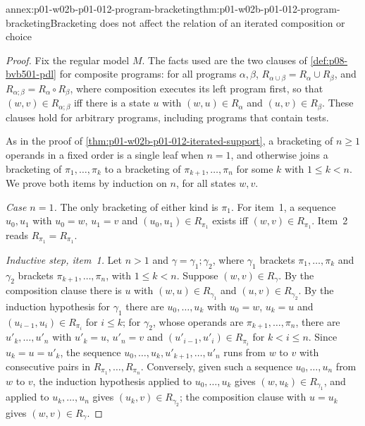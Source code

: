 \begin{annexitem}{annex:p01-w02b-p01-012-program-bracketing}{thm:p01-w02b-p01-012-program-bracketing}{Bracketing does not affect the relation of an iterated composition or choice}
\begin{proof}
Fix the regular model \(M\).  The facts used are the two clauses of
\cref{def:p08-bvb501-pdl} for composite programs: for all programs
\(\alpha,\beta\), \(R_{\alpha\cup\beta}=R_\alpha\cup R_\beta\), and
\(R_{\alpha;\beta}=R_\alpha\circ R_\beta\), where composition executes its
left program first, so that \((w,v)\in R_{\alpha;\beta}\) iff there is a
state \(u\) with \((w,u)\in R_\alpha\) and \((u,v)\in R_\beta\).  These
clauses hold for arbitrary programs, including programs that contain
tests.

As in the proof of \cref{thm:p01-w02b-p01-012-iterated-support}, a
bracketing of \(n\geq1\) operands in a fixed order is a single leaf when
\(n=1\), and otherwise joins a bracketing of \(\pi_1,\ldots,\pi_k\) to a
bracketing of \(\pi_{k+1},\ldots,\pi_n\) for some \(k\) with \(1\leq k<n\).
We prove both items by induction on \(n\), for all states \(w,v\).

\emph{Case \(n=1\).}  The only bracketing of either kind is \(\pi_1\).
For item~1, a sequence \(u_0,u_1\) with \(u_0=w\), \(u_1=v\) and
\((u_0,u_1)\in R_{\pi_1}\) exists iff \((w,v)\in R_{\pi_1}\).  Item~2 reads
\(R_{\pi_1}=R_{\pi_1}\).

\emph{Inductive step, item~1.}  Let \(n>1\) and
\(\gamma=\gamma_1;\gamma_2\), where \(\gamma_1\) brackets
\(\pi_1,\ldots,\pi_k\) and \(\gamma_2\) brackets
\(\pi_{k+1},\ldots,\pi_n\), with \(1\leq k<n\).  Suppose
\((w,v)\in R_\gamma\).  By the composition clause there is \(u\) with
\((w,u)\in R_{\gamma_1}\) and \((u,v)\in R_{\gamma_2}\).  By the induction
hypothesis for \(\gamma_1\) there are \(u_0,\ldots,u_k\) with \(u_0=w\),
\(u_k=u\) and \((u_{i-1},u_i)\in R_{\pi_i}\) for \(i\leq k\); for
\(\gamma_2\), whose operands are \(\pi_{k+1},\ldots,\pi_n\), there are
\(u'_k,\ldots,u'_n\) with \(u'_k=u\), \(u'_n=v\) and
\((u'_{i-1},u'_i)\in R_{\pi_i}\) for \(k<i\leq n\).  Since \(u_k=u=u'_k\),
the sequence \(u_0,\ldots,u_k,u'_{k+1},\ldots,u'_n\) runs from \(w\) to
\(v\) with consecutive pairs in \(R_{\pi_1},\ldots,R_{\pi_n}\).
Conversely, given such a sequence \(u_0,\ldots,u_n\) from \(w\) to \(v\),
the induction hypothesis applied to \(u_0,\ldots,u_k\) gives
\((w,u_k)\in R_{\gamma_1}\), and applied to \(u_k,\ldots,u_n\) gives
\((u_k,v)\in R_{\gamma_2}\); the composition clause with \(u=u_k\) gives
\((w,v)\in R_\gamma\).


\end{proof}
\end{annexitem}

